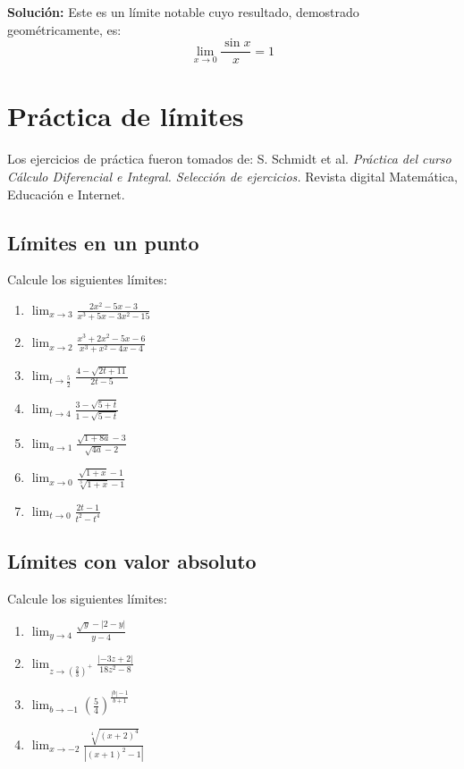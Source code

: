\documentclass[12pt]{article}
\begin{document}
\textbf{Solución:}
Este es un límite notable cuyo resultado, demostrado geométricamente, es:
\[
\lim_{x \to 0} \frac{\sin x}{x} = 1
\]

\section{Práctica de límites}

Los ejercicios de práctica fueron tomados de: S. Schmidt et al. \textit{Práctica del curso Cálculo Diferencial e Integral. Selección de ejercicios.} Revista digital Matemática, Educación e Internet.

\subsection{Límites en un punto}
Calcule los siguientes límites:
\begin{enumerate}
    \item $\displaystyle \lim_{x \to 3} \frac{2x^2 - 5x - 3}{x^3 + 5x - 3x^2 - 15}$
    \item $\displaystyle \lim_{x \to 2} \frac{x^3 + 2x^2 - 5x - 6}{x^3 + x^2 - 4x - 4}$
    \item $\displaystyle \lim_{t \to \frac{5}{2}} \frac{4 - \sqrt{2t + 11}}{2t - 5}$
    \item $\displaystyle \lim_{t \to 4} \frac{3 - \sqrt{5 + t}}{1 - \sqrt{5 - t}}$
    \item $\displaystyle \lim_{a \to 1} \frac{\sqrt{1 + 8a} - 3}{\sqrt{4a} - 2}$
    \item $\displaystyle \lim_{x \to 0} \frac{\sqrt{1 + x} - 1}{\sqrt[3]{1 + x} - 1}$
    \item $\displaystyle \lim_{t \to 0} \frac{2t - 1}{t^2 - t^4}$
\end{enumerate}

\subsection{Límites con valor absoluto}
Calcule los siguientes límites:
\begin{enumerate}
    \item $\displaystyle \lim_{y \to 4} \frac{\sqrt{y} - |2 - y|}{y - 4}$
    \item $\displaystyle \lim_{z \to \left(\frac{2}{3}\right)^+} \frac{|-3z + 2|}{18z^2 - 8}$
    \item $\displaystyle \lim_{b \to -1} \left(\frac{5}{4}\right)^{\frac{|b| - 1}{b + 1}}$
    \item $\displaystyle \lim_{x \to -2} \frac{\sqrt[4]{(x + 2)^4}}{|(x + 1)^2 - 1|}$
\end{enumerate}
\end{document}
